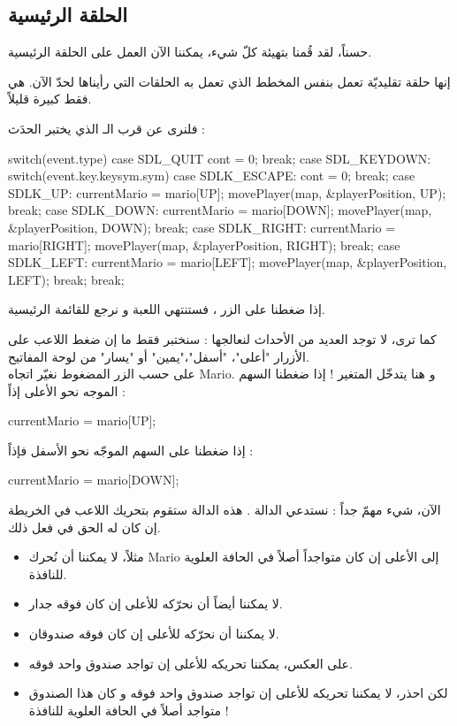 \subsection{الحلقة الرئيسية}

حسناً، لقد قُمنا بتهيئة كلّ شيء، يمكننا الآن العمل على الحلقة الرئيسية.

إنها حلقة تقليديّة تعمل بنفس المخطط الذي تعمل به الحلقات التي رأيناها لحدّ الآن. هي فقط كبيرة قليلاً.

فلنرى عن قرب الـ
الذي يختبر الحدَث :

\begin{Csource}
switch(event.type)
{
	case SDL_QUIT
	cont = 0;
	break;
	case SDL_KEYDOWN:
	switch(event.key.keysym.sym)
	{
		case SDLK_ESCAPE:
		cont = 0;
		break;
		case SDLK_UP:
		currentMario = mario[UP];
		movePlayer(map, &playerPosition, UP);
		break;
		case SDLK_DOWN:
		currentMario = mario[DOWN];
		movePlayer(map, &playerPosition, DOWN);
		break;
		case SDLK_RIGHT:
		currentMario = mario[RIGHT];
		movePlayer(map, &playerPosition, RIGHT);
		break;
		case SDLK_LEFT:
		currentMario = mario[LEFT];
		movePlayer(map, &playerPosition, LEFT);
		break;
	}
	break;
}
\end{Csource}

إذا ضغطنا على الزر
،
فستنتهي اللعبة و نرجع للقائمة الرئيسية.

كما ترى، لا توجد العديد من الأحداث لنعالجها : سنختبر فقط ما إن ضغط اللاعب على الأزرار "أعلى"، "أسفل"،"يمين" أو "يسار" من لوحة المفاتيح.\\
على حسب الزر المضغوط نغيّر اتجاه 
\textenglish{Mario}.
 و هنا يتدخّل المتغير 
 !
 إذا ضغطنا السهم الموجه نحو الأعلى إذاً :

\begin{Csource}
currentMario = mario[UP];
\end{Csource}

إذا ضغطنا على السهم الموجّه نحو الأسفل فإذاً :

\begin{Csource}
currentMario = mario[DOWN];
\end{Csource}

الآن، شيء مهمّ جداً : نستدعي الدالة
.
هذه الدالة ستقوم بتحريك اللاعب في الخريطة إن كان له الحق في فعل ذلك.

\begin{itemize}
	\item مثلاً، لا يمكننا أن نُحرك 
	\textenglish{Mario}
	إلى الأعلى إن كان متواجداً أصلاً في الحافة العلوية للنافذة.
	\item لا يمكننا أيضاً أن نحرّكه للأعلى إن كان فوقه جدار.
	\item لا يمكننا أن نحرّكه للأعلى إن كان فوقه صندوقان.
	\item على العكس، يمكننا تحريكه للأعلى إن تواجد صندوق واحد فوقه.
	\item لكن احذر، لا يمكننا تحريكه للأعلى إن تواجد صندوق واحد فوقه و كان هذا الصندوق متواجد أصلاً في الحافة العلوية للنافذة !
\end{itemize}

